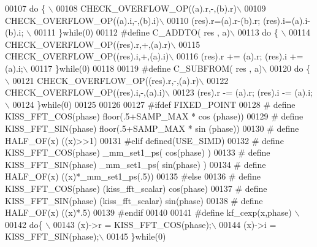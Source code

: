 \begin{DoxyCode}
00107 \textcolor{preprocessor}{    do \{ \(\backslash\)}
00108 \textcolor{preprocessor}{        CHECK\_OVERFLOW\_OP((a).r,-,(b).r)\(\backslash\)}
00109 \textcolor{preprocessor}{        CHECK\_OVERFLOW\_OP((a).i,-,(b).i)\(\backslash\)}
00110 \textcolor{preprocessor}{        (res).r=(a).r-(b).r;  (res).i=(a).i-(b).i; \(\backslash\)}
00111 \textcolor{preprocessor}{    \}while(0)}
00112 \textcolor{preprocessor}{#define C\_ADDTO( res , a)\(\backslash\)}
00113 \textcolor{preprocessor}{    do \{ \(\backslash\)}
00114 \textcolor{preprocessor}{        CHECK\_OVERFLOW\_OP((res).r,+,(a).r)\(\backslash\)}
00115 \textcolor{preprocessor}{        CHECK\_OVERFLOW\_OP((res).i,+,(a).i)\(\backslash\)}
00116 \textcolor{preprocessor}{        (res).r += (a).r;  (res).i += (a).i;\(\backslash\)}
00117 \textcolor{preprocessor}{    \}while(0)}
00118 
00119 \textcolor{preprocessor}{#define C\_SUBFROM( res , a)\(\backslash\)}
00120 \textcolor{preprocessor}{    do \{\(\backslash\)}
00121 \textcolor{preprocessor}{        CHECK\_OVERFLOW\_OP((res).r,-,(a).r)\(\backslash\)}
00122 \textcolor{preprocessor}{        CHECK\_OVERFLOW\_OP((res).i,-,(a).i)\(\backslash\)}
00123 \textcolor{preprocessor}{        (res).r -= (a).r;  (res).i -= (a).i; \(\backslash\)}
00124 \textcolor{preprocessor}{    \}while(0)}
00125 
00126 
00127 \textcolor{preprocessor}{#ifdef FIXED\_POINT}
00128 \textcolor{preprocessor}{#  define KISS\_FFT\_COS(phase)  floor(.5+SAMP\_MAX * cos (phase))}
00129 \textcolor{preprocessor}{#  define KISS\_FFT\_SIN(phase)  floor(.5+SAMP\_MAX * sin (phase))}
00130 \textcolor{preprocessor}{#  define HALF\_OF(x) ((x)>>1)}
00131 \textcolor{preprocessor}{#elif defined(USE\_SIMD)}
00132 \textcolor{preprocessor}{#  define KISS\_FFT\_COS(phase) \_mm\_set1\_ps( cos(phase) )}
00133 \textcolor{preprocessor}{#  define KISS\_FFT\_SIN(phase) \_mm\_set1\_ps( sin(phase) )}
00134 \textcolor{preprocessor}{#  define HALF\_OF(x) ((x)*\_mm\_set1\_ps(.5))}
00135 \textcolor{preprocessor}{#else}
00136 \textcolor{preprocessor}{#  define KISS\_FFT\_COS(phase) (kiss\_fft\_scalar) cos(phase)}
00137 \textcolor{preprocessor}{#  define KISS\_FFT\_SIN(phase) (kiss\_fft\_scalar) sin(phase)}
00138 \textcolor{preprocessor}{#  define HALF\_OF(x) ((x)*.5)}
00139 \textcolor{preprocessor}{#endif}
00140 
00141 \textcolor{preprocessor}{#define  kf\_cexp(x,phase) \(\backslash\)}
00142 \textcolor{preprocessor}{    do\{ \(\backslash\)}
00143 \textcolor{preprocessor}{        (x)->r = KISS\_FFT\_COS(phase);\(\backslash\)}
00144 \textcolor{preprocessor}{        (x)->i = KISS\_FFT\_SIN(phase);\(\backslash\)}
00145 \textcolor{preprocessor}{    \}while(0)}

\end{DoxyCode}
